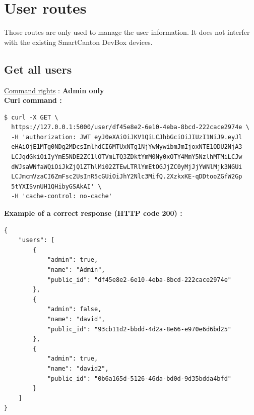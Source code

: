 \clearpage
\section{User routes}

Those routes are only used to manage the user information. It does not interfer with the existing SmartCanton DevBox devices.

\subsection{Get all users}

\underline{Command rights} : \textbf{Admin only}\\

\textbf{Curl command :}

\begin{tcolorbox}[top=-3mm, bottom=-3mm, left=0mm, right=0mm, enhanced, breakable, colback=LightGray, colframe=DarkGray, colbacktitle=DarkGray]
\begin{verbatim}
$ curl -X GET \
  https://127.0.0.1:5000/user/df45e8e2-6e10-4eba-8bcd-222cace2974e \
  -H 'authorization: JWT eyJ0eXAiOiJKV1QiLCJhbGciOiJIUzI1NiJ9.eyJl
  eHAiOjE1MTg0NDg2MDcsImlhdCI6MTUxNTg1NjYwNywibmJmIjoxNTE1ODU2NjA3
  LCJqdGkiOiIyYmE5NDE2ZC1lOTVmLTQ3ZDktYmM0Ny0xOTY4MmY5NzlhMTMiLCJw
  dWJsaWNfaWQiOiJkZjQ1ZThlMi02ZTEwLTRlYmEtOGJjZC0yMjJjYWNlMjk3NGUi
  LCJmcmVzaCI6ZmFsc2UsInR5cGUiOiJhY2Nlc3MifQ.2XzkxKE-qDDtooZGfW2Gp
  5tYXISvnUH1QHibyGSAkAI' \
  -H 'cache-control: no-cache'
\end{verbatim}
\end{tcolorbox}

\textbf{Example of a correct response (HTTP code 200) : }

\begin{tcolorbox}[top=-3mm, bottom=-3mm, left=0mm, right=0mm, enhanced, breakable, colback=LightGray, colframe=DarkGray, colbacktitle=DarkGray]
\begin{verbatim}
{
    "users": [
        {
            "admin": true,
            "name": "Admin",
            "public_id": "df45e8e2-6e10-4eba-8bcd-222cace2974e"
        },
        {
            "admin": false,
            "name": "david",
            "public_id": "93cb11d2-bbdd-4d2a-8e66-e970e6d6bd25"
        },
        {
            "admin": true,
            "name": "david2",
            "public_id": "0b6a165d-5126-46da-bd0d-9d35bdda4bfd"
        }
    ]
}
\end{verbatim}
\end{tcolorbox}


